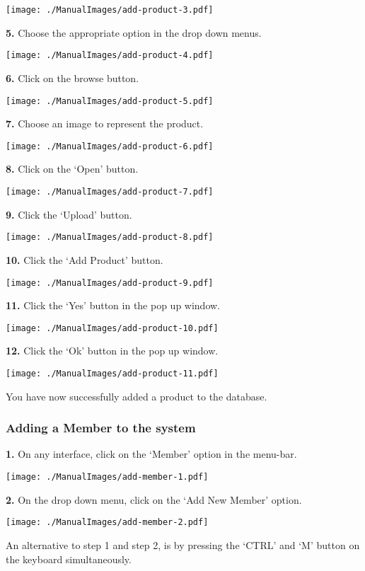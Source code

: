 \texttt{[image: ./ManualImages/add-product-3.pdf]}

\textbf{5.} Choose the appropriate option in the drop down menus.

\texttt{[image: ./ManualImages/add-product-4.pdf]}

\textbf{6.} Click on the browse button.

\texttt{[image: ./ManualImages/add-product-5.pdf]}

\textbf{7.} Choose an image to represent the product.

\texttt{[image: ./ManualImages/add-product-6.pdf]}

\textbf{8.} Click on the `Open' button.

\texttt{[image: ./ManualImages/add-product-7.pdf]}

\textbf{9.} Click the `Upload' button.

\texttt{[image: ./ManualImages/add-product-8.pdf]}

\textbf{10.} Click the `Add Product' button.

\texttt{[image: ./ManualImages/add-product-9.pdf]}

\textbf{11.} Click the `Yes' button in the pop up window.

\texttt{[image: ./ManualImages/add-product-10.pdf]}

\textbf{12.} Click the `Ok' button in the pop up window.

\texttt{[image: ./ManualImages/add-product-11.pdf]}

You have now successfully added a product to the database.

\pagebreak
\subsubsection{Adding a Member to the system}
\label{fig:Adding a Member to the system}

\textbf{1.} On any interface, click on the `Member' option in the menu-bar.

\texttt{[image: ./ManualImages/add-member-1.pdf]}

\textbf{2.} On the drop down menu, click on the `Add New Member' option.

\texttt{[image: ./ManualImages/add-member-2.pdf]}

An alternative to step 1 and step 2, is by pressing the `CTRL' and `M' button on the keyboard simultaneously.

